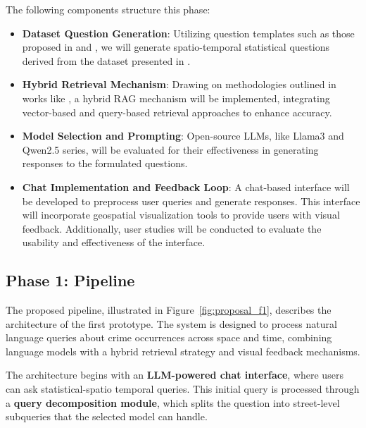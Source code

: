 The following components structure this phase:

\begin{itemize}
    \item \textbf{Dataset Question Generation}: Utilizing question templates such as those proposed in \cite{Contractor2020QATourism} and \cite{Dai2024QASTKG}, we will generate spatio-temporal statistical questions derived from the dataset presented in \cite{Zhang2025CrimeDatasetChina}.
    \item \textbf{Hybrid Retrieval Mechanism}: Drawing on methodologies outlined in works like \cite{Guo2024LightRAG}, a hybrid RAG mechanism will be implemented, integrating vector-based and query-based retrieval approaches to enhance accuracy.
    \item \textbf{Model Selection and Prompting}: Open-source LLMs, like Llama3 \cite{Grattafiori2024Llama3} and Qwen2.5 \cite{Qwen2025Qwen2.5} series, will be evaluated for their effectiveness in generating responses to the formulated questions.
    \item \textbf{Chat Implementation and Feedback Loop}: A chat-based interface will be developed to preprocess user queries and generate responses. This interface will incorporate geospatial visualization tools to provide users with visual feedback. Additionally, user studies will be conducted to evaluate the usability and effectiveness of the interface.
\end{itemize}



\subsection{Phase 1: Pipeline}

The proposed pipeline, illustrated in Figure~\ref{fig:proposal_f1}, describes the architecture of the first prototype. The system is designed to process natural language queries about crime occurrences across space and time, combining language models with a hybrid retrieval strategy and visual feedback mechanisms.

The architecture begins with an \textbf{LLM-powered chat interface}, where users can ask statistical-spatio temporal queries. This initial query is processed through a \textbf{query decomposition module}, which splits the question into street-level subqueries that the selected model can handle.

